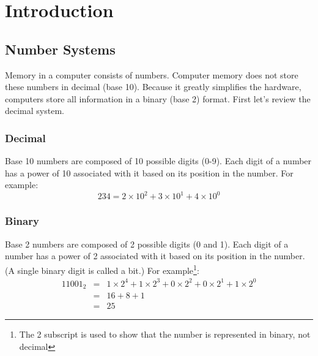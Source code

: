 \chapter{Introduction}
\section{Number Systems}

Memory in a computer consists of numbers. Computer memory does not
store these numbers in decimal (base 10). Because it greatly
simplifies the hardware, computers store all information in a binary
(base 2) format. First let's review the decimal system.

\subsection{Decimal}

Base 10 numbers are composed of 10 possible digits (0-9). Each digit
of a number has a power of 10 associated with it based on its position
in the number. For example:
\begin{displaymath}
234 = 2 \times 10^2 + 3 \times 10^1 + 4 \times 10^0
\end{displaymath}

\subsection{Binary}

Base 2 numbers are composed of 2 possible digits (0 and 1). Each digit
of a number has a power of 2 associated with it based on its position
in the number. (A single binary digit is called a bit.) For
example\footnote{The 2 subscript is used to show that the number is
represented in binary, not decimal}:
\begin{eqnarray*}
11001_2 & = & 1 \times 2^4 + 1 \times 2^3 + 0 \times 2^2 + 0 \times 2^1 
              + 1 \times 2^0 \\
 & = & 16 + 8 + 1 \\
 & = & 25 
\end{eqnarray*}

